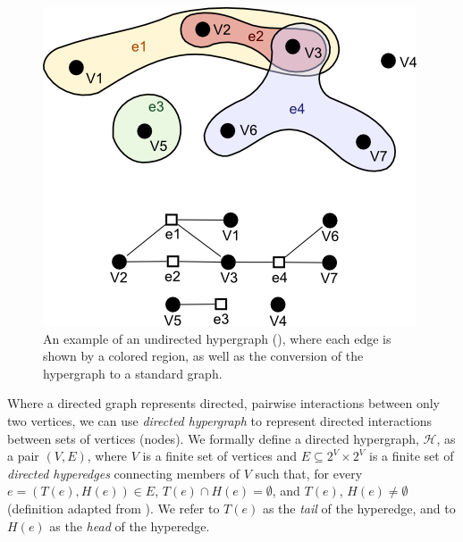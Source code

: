 \documentclass[12pt,twoside]{reedthesis}
\theoremstyle{definition}
\begin{document}
\begin{figure}[thbp]
  \begin{center}
    \includegraphics[width=\textwidth/2]{undirected_hypergraph}
  \caption[An example undirected hypergraph]{An example of an undirected hypergraph (\cite{sharpen}), where each edge is shown by a colored region, as well as the conversion of the hypergraph to a standard graph.}
  \label{fig:undirected_hypergraph}
  \end{center}
\end{figure}

Where a directed graph represents directed, pairwise interactions between only two vertices, we can use \textit{directed hypergraph} to represent directed interactions between sets of vertices (nodes). We formally define a directed hypergraph, $\mathcal{H}$, as a pair $(V,E)$, where $V$ is a finite set of vertices and $E \subseteq 2^V \times 2^V$ is a finite set of \textit{directed hyperedges} connecting members of $V$ such that, for every $e=(T(e),H(e)) \in E$, $T(e) \cap H(e) = \emptyset$, and $T(e)$, $H(e) \neq \emptyset$ (definition adapted from \cite{Gallo1993}).  We refer to $T(e)$ as the \textit{tail} of the hyperedge, and to $H(e)$ as the \textit{head} of the hyperedge.\par
\end{document}

